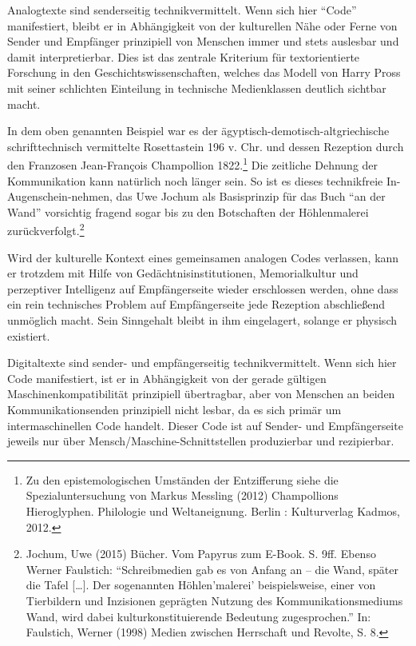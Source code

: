 \documentclass[a4paper,
fontsize=11pt,
oneside,
numbers=noperiodatend,
parskip=half-,
bibliography=totoc,
final
]{scrartcl}
\begin{document}
Analogtexte sind senderseitig technikvermittelt. Wenn sich hier
\enquote{Code} manifestiert, bleibt er in Abhängigkeit von der
kulturellen Nähe oder Ferne von Sender und Empfänger prinzipiell von
Menschen immer und stets auslesbar und damit interpretierbar. Dies ist
das zentrale Kriterium für textorientierte Forschung in den
Geschichtswissenschaften, welches das Modell von Harry Pross mit seiner
schlichten Einteilung in technische Medienklassen deutlich sichtbar
macht.

In dem oben genannten Beispiel war es der
ägyptisch-demotisch-altgriechische schrifttechnisch vermittelte
Rosettastein 196 v. Chr. und dessen Rezeption durch den Franzosen
Jean-François Champollion 1822.\footnote{Zu den epistemologischen
  Umständen der Entzifferung siehe die Spezialuntersuchung von Markus
  Messling (2012) Champollions Hieroglyphen. Philologie und
  Weltaneignung. Berlin : Kulturverlag Kadmos, 2012.} Die zeitliche
Dehnung der Kommunikation kann natürlich noch länger sein. So ist es
dieses technikfreie In-Augenschein-nehmen, das Uwe Jochum als
Basisprinzip für das Buch \enquote{an der Wand} vorsichtig fragend sogar
bis zu den Botschaften der Höhlenmalerei zurückverfolgt.\footnote{Jochum,
  Uwe (2015) Bücher. Vom Papyrus zum E-Book. S. 9ff. Ebenso Werner
  Faulstich: \enquote{Schreibmedien gab es von Anfang an -- die Wand,
  später die Tafel {[}\ldots{}{]}. Der sogenannten Höhlen'malerei'
  beispielsweise, einer von Tierbildern und Inzisionen geprägten Nutzung
  des Kommunikationsmediums Wand, wird dabei kulturkonstituierende
  Bedeutung zugesprochen.} In: Faulstich, Werner (1998) Medien zwischen
  Herrschaft und Revolte, S. 8.}

Wird der kulturelle Kontext eines gemeinsamen analogen Codes verlassen,
kann er trotzdem mit Hilfe von Gedächtnisinstitutionen, Memorialkultur
und perzeptiver Intelligenz auf Empfängerseite wieder erschlossen
werden, ohne dass ein rein technisches Problem auf Empfängerseite jede
Rezeption abschließend unmöglich macht. Sein Sinngehalt bleibt in ihm
eingelagert, solange er physisch existiert.

Digitaltexte sind sender- und empfängerseitig technikvermittelt. Wenn
sich hier Code manifestiert, ist er in Abhängigkeit von der gerade
gültigen Maschinenkompatibilität prinzipiell übertragbar, aber von
Menschen an beiden Kommunikationsenden prinzipiell nicht lesbar, da es
sich primär um intermaschinellen Code handelt. Dieser Code ist auf
Sender- und Empfängerseite jeweils nur über
Mensch/Maschine-Schnittstellen produzierbar und rezipierbar.
\end{document}
